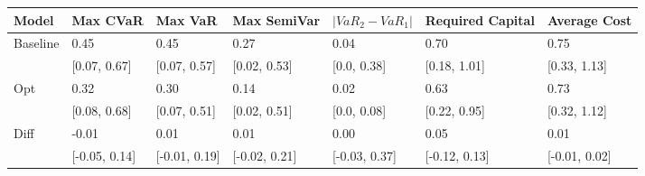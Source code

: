 \begin{tabular}{lllllll}
\toprule
   Model &      Max CVaR &       Max VaR &   Max SemiVar & $|VaR_2 - VaR_1|$ & Required Capital &  Average Cost \\
\midrule
Baseline &          0.45 &          0.45 &          0.27 &              0.04 &             0.70 &          0.75 \\
         &  [0.07, 0.67] &  [0.07, 0.57] &  [0.02, 0.53] &       [0.0, 0.38] &     [0.18, 1.01] &  [0.33, 1.13] \\
     Opt &          0.32 &          0.30 &          0.14 &              0.02 &             0.63 &          0.73 \\
         &  [0.08, 0.68] &  [0.07, 0.51] &  [0.02, 0.51] &       [0.0, 0.08] &     [0.22, 0.95] &  [0.32, 1.12] \\
    Diff &         -0.01 &          0.01 &          0.01 &              0.00 &             0.05 &          0.01 \\
         & [-0.05, 0.14] & [-0.01, 0.19] & [-0.02, 0.21] &     [-0.03, 0.37] &    [-0.12, 0.13] & [-0.01, 0.02] \\
\bottomrule
\end{tabular}
